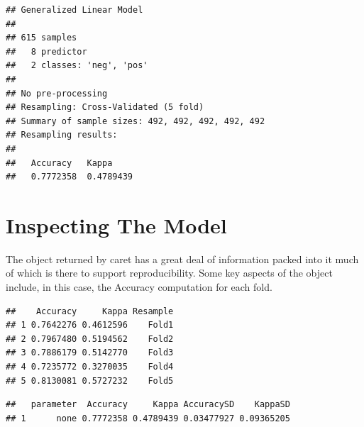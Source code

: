 \documentclass[]{book}
\newenvironment{Shaded}{\begin{snugshade}}{\end{snugshade}}
\newcommand{\KeywordTok}[1]{\textcolor[rgb]{0.13,0.29,0.53}{\textbf{#1}}}
\newcommand{\DecValTok}[1]{\textcolor[rgb]{0.00,0.00,0.81}{#1}}
\newcommand{\StringTok}[1]{\textcolor[rgb]{0.31,0.60,0.02}{#1}}
\newcommand{\CommentTok}[1]{\textcolor[rgb]{0.56,0.35,0.01}{\textit{#1}}}
\newcommand{\OperatorTok}[1]{\textcolor[rgb]{0.81,0.36,0.00}{\textbf{#1}}}
\newcommand{\NormalTok}[1]{#1}
\begin{document}
\begin{verbatim}
## Generalized Linear Model 
## 
## 615 samples
##   8 predictor
##   2 classes: 'neg', 'pos' 
## 
## No pre-processing
## Resampling: Cross-Validated (5 fold) 
## Summary of sample sizes: 492, 492, 492, 492, 492 
## Resampling results:
## 
##   Accuracy   Kappa    
##   0.7772358  0.4789439
\end{verbatim}

\section{Inspecting The Model}\label{inspecting-the-model}

The object returned by caret has a great deal of information packed into
it much of which is there to support reproducibility. Some key aspects
of the object include, in this case, the Accuracy computation for each
fold.

\begin{Shaded}
\end{Shaded}

\begin{verbatim}
##    Accuracy     Kappa Resample
## 1 0.7642276 0.4612596    Fold1
## 2 0.7967480 0.5194562    Fold2
## 3 0.7886179 0.5142770    Fold3
## 4 0.7235772 0.3270035    Fold4
## 5 0.8130081 0.5727232    Fold5
\end{verbatim}

\begin{Shaded}
\end{Shaded}

\begin{verbatim}
##   parameter  Accuracy     Kappa AccuracySD    KappaSD
## 1      none 0.7772358 0.4789439 0.03477927 0.09365205
\end{verbatim}

\begin{Shaded}
\end{Shaded}
\end{document}
